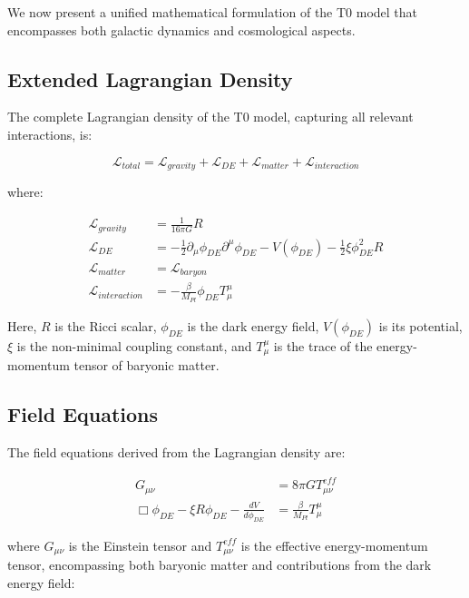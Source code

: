 \documentclass[a4paper,12pt]{article}
\begin{document}
	We now present a unified mathematical formulation of the T0 model that encompasses both galactic dynamics and cosmological aspects.
	
	\subsection{Extended Lagrangian Density}
	
	The complete Lagrangian density of the T0 model, capturing all relevant interactions, is:
	
	\begin{equation}
		\mathcal{L}_{total} = \mathcal{L}_{gravity} + \mathcal{L}_{DE} + \mathcal{L}_{matter} + \mathcal{L}_{interaction}
	\end{equation}
	
	where:
	
	\begin{align}
		\mathcal{L}_{gravity} &= \frac{1}{16\pi G}R\\
		\mathcal{L}_{DE} &= -\frac{1}{2}\partial_\mu \phi_{DE} \partial^\mu \phi_{DE} - V(\phi_{DE}) - \frac{1}{2}\xi \phi_{DE}^2 R\\
		\mathcal{L}_{matter} &= \mathcal{L}_{baryon}\\
		\mathcal{L}_{interaction} &= -\frac{\beta}{M_{Pl}}\phi_{DE}T^{\mu}_{\mu}
	\end{align}
	
	Here, $R$ is the Ricci scalar, $\phi_{DE}$ is the dark energy field, $V(\phi_{DE})$ is its potential, $\xi$ is the non-minimal coupling constant, and $T^{\mu}_{\mu}$ is the trace of the energy-momentum tensor of baryonic matter.
	
	\subsection{Field Equations}
	
	The field equations derived from the Lagrangian density are:
	
	\begin{align}
		G_{\mu\nu} &= 8\pi G T_{\mu\nu}^{eff}\\
		\Box\phi_{DE} - \xi R \phi_{DE} - \frac{dV}{d\phi_{DE}} &= \frac{\beta}{M_{Pl}}T^{\mu}_{\mu}
	\end{align}
	
	where $G_{\mu\nu}$ is the Einstein tensor and $T_{\mu\nu}^{eff}$ is the effective energy-momentum tensor, encompassing both baryonic matter and contributions from the dark energy field:
	
\end{document}
